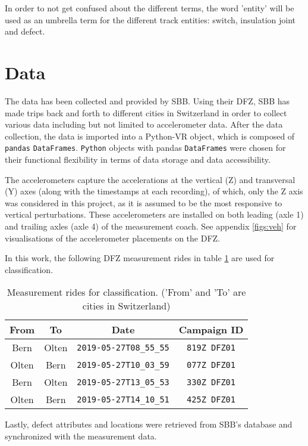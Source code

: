In order to not get confused about the different terms, the word 'entity' will be used as an umbrella term for the different track entities: switch, insulation joint and defect.

\section{Data}
The data has been collected and provided by SBB. Using their DFZ, SBB has made trips back and forth to different cities in Switzerland in order to collect various data including but not limited to accelerometer data. After the data collection, the data is imported into a Python-VR object, which is composed of \verb|pandas| \verb|DataFrames|. \verb|Python| objects with pandas \verb|DataFrames| were chosen for their functional flexibility in terms of data storage and data accessibility.

The accelerometers capture the accelerations at the vertical (Z) and transversal (Y) axes (along with the timestamps at each recording), of which, only the Z axis was considered in this project, as it is assumed to be the most responsive to vertical perturbations. These accelerometers are installed on both leading (axle 1) and trailing axles (axle 4) of the measurement coach. See appendix \ref{figs:veh} for visualisations of the accelerometer placements on the DFZ. 

In this work, the following DFZ measurement rides in table \ref{tab:rides} are used for classification.

\begin{table}[H]
	\centering
	\begin{tabular}{|c|c|c|c|} \hline
		\textbf{From} & \textbf{To} & \textbf{Date} & \textbf{Campaign ID}\\ \hline \hline 
		Bern & Olten &  \verb|2019-05-27T08_55_55| & \verb|819Z DFZ01| \\ \hline 
		Olten & Bern &  \verb|2019-05-27T10_03_59| & \verb|077Z DFZ01| \\ \hline 
		Bern & Olten &  \verb|2019-05-27T13_05_53| & \verb|330Z DFZ01| \\ \hline 
		Olten & Bern &  \verb|2019-05-27T14_10_51| & \verb|425Z DFZ01| \\ \hline 
	\end{tabular}
	\caption{Measurement rides for classification. ('From' and 'To' are cities in Switzerland)}
	\label{tab:rides}
\end{table}

Lastly, defect attributes and locations were retrieved from SBB's database and synchronized with the measurement data.

